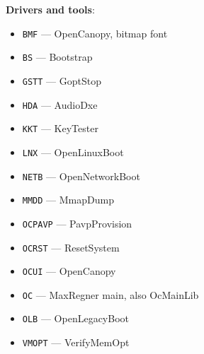 \documentclass[]{article}
\providecommand{\tightlist}{%
  \setlength{\itemsep}{0pt}\setlength{\parskip}{0pt}}
\begin{document}
\begin{enumerate}
  \textbf{Drivers and tools}:
  \begin{itemize}
  \tightlist
  \item \texttt{BMF} --- OpenCanopy, bitmap font
  \item \texttt{BS} --- Bootstrap
  \item \texttt{GSTT} --- GoptStop
  \item \texttt{HDA} --- AudioDxe
  \item \texttt{KKT} --- KeyTester
  \item \texttt{LNX} --- OpenLinuxBoot
  \item \texttt{NETB} --- OpenNetworkBoot
  \item \texttt{MMDD} --- MmapDump
  \item \texttt{OCPAVP} --- PavpProvision
  \item \texttt{OCRST} --- ResetSystem
  \item \texttt{OCUI} --- OpenCanopy
  \item \texttt{OC} --- MaxRegner main, also OcMainLib
  \item \texttt{OLB} --- OpenLegacyBoot
  \item \texttt{VMOPT} --- VerifyMemOpt
  \end{itemize}


\end{enumerate}
\end{document}
